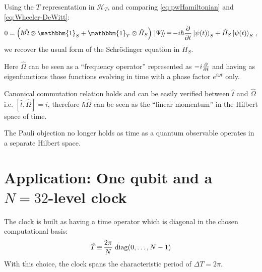 \documentclass[a0,portrait]{a0poster}
\newcommand{\idop}{\mathbbm{1}}           %
\newcommand{\hilb}[1]{\mathcal{#1}}       %
\newcommand{\ox}{\otimes}
\DeclareMathOperator*{\repr}{\equiv}      %
\newcommand{\smallback}{\hspace{-0.115em}}
\newcommand{\dket}[1]{\left.\left| #1 \right\rangle\smallback\right\rangle}
\begin{document}
\begin{multicols}{2}
Using the $T$ representation in $\hilb{H}_T$,
and comparing \eqref{eq:pwHamiltonian} and \eqref{eq:Wheeler-DeWitt}:
\begin{equation}\label{eq:schrod_from_pw}
  0 = \qty(\hbar\hat{\Omega}\ox\idop_S + \idop_{T}\ox\hat{H}_S)\dket{\Psi}
    \repr -i\hbar\pdv{t}\ket{\psi(t)}_{S} + \hat{H}_S\ket{\psi(t)}_{S}
    \,\text{,}
\end{equation}
we recover the usual form of the Schr\"{o}dinger equation in $H_S$.

Here $\hat{\Omega}$ can be seen as a ``frequency operator''
represented as $-i\pdv{t}$ and having as eigenfunctions
those functions evolving in time with a phase factor $e^{i \omega t}$ only.

Canonical commutation relation holds and can be easily verified
between $\hat{t}$ and $\hat{\Omega}$
i.e. $[\hat{t}, \hat{\Omega}] = i$,
therefore $\hbar\hat{\Omega}$ can be seen as the ``linear momentum''
in the Hilbert space of time.

The Pauli objection no longer holds as time as a quantum observable operates in a separate Hilbert space.



\section*{Application: One qubit and a $N=32$-level clock}

The clock is built as having a time operator which is diagonal in the
chosen computational basis:
\[
  \hat{T} \repr \frac{2\pi}{N} \,\;\! \mathrm{diag}\qty(0, \dots, N-1)
\]
With this choice, the clock spans the characteristic period of $\Delta T = 2\pi$.


\end{multicols}
\end{document}
